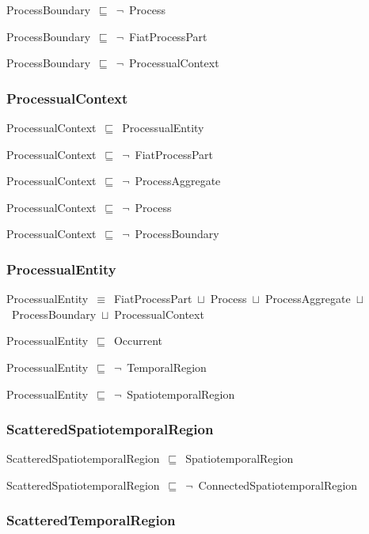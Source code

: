 \documentclass{article}
\begin{document}
ProcessBoundary~\ensuremath{\sqsubseteq}~\ensuremath{\lnot}~Process

ProcessBoundary~\ensuremath{\sqsubseteq}~\ensuremath{\lnot}~FiatProcessPart

ProcessBoundary~\ensuremath{\sqsubseteq}~\ensuremath{\lnot}~ProcessualContext

\subsubsection*{ProcessualContext}

ProcessualContext~\ensuremath{\sqsubseteq}~ProcessualEntity~

ProcessualContext~\ensuremath{\sqsubseteq}~\ensuremath{\lnot}~FiatProcessPart

ProcessualContext~\ensuremath{\sqsubseteq}~\ensuremath{\lnot}~ProcessAggregate

ProcessualContext~\ensuremath{\sqsubseteq}~\ensuremath{\lnot}~Process

ProcessualContext~\ensuremath{\sqsubseteq}~\ensuremath{\lnot}~ProcessBoundary

\subsubsection*{ProcessualEntity}

ProcessualEntity~\ensuremath{\equiv}~FiatProcessPart~\ensuremath{\sqcup}~Process~\ensuremath{\sqcup}~ProcessAggregate~\ensuremath{\sqcup}~ProcessBoundary~\ensuremath{\sqcup}~ProcessualContext

ProcessualEntity~\ensuremath{\sqsubseteq}~Occurrent~

ProcessualEntity~\ensuremath{\sqsubseteq}~\ensuremath{\lnot}~TemporalRegion

ProcessualEntity~\ensuremath{\sqsubseteq}~\ensuremath{\lnot}~SpatiotemporalRegion

\subsubsection*{ScatteredSpatiotemporalRegion}

ScatteredSpatiotemporalRegion~\ensuremath{\sqsubseteq}~SpatiotemporalRegion~

ScatteredSpatiotemporalRegion~\ensuremath{\sqsubseteq}~\ensuremath{\lnot}~ConnectedSpatiotemporalRegion

\subsubsection*{ScatteredTemporalRegion}
\end{document}
